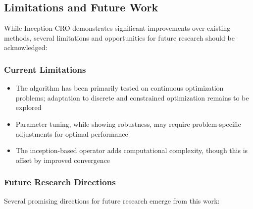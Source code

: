 \subsection{Limitations and Future Work}

While Inception-CRO demonstrates significant improvements over existing methods, several limitations and opportunities for future research should be acknowledged:

\subsubsection{Current Limitations}

\begin{itemize}
    \item The algorithm has been primarily tested on continuous optimization problems; adaptation to discrete and constrained optimization remains to be explored
    \item Parameter tuning, while showing robustness, may require problem-specific adjustments for optimal performance
    \item The inception-based operator adds computational complexity, though this is offset by improved convergence
\end{itemize}

\subsubsection{Future Research Directions}

Several promising directions for future research emerge from this work:

